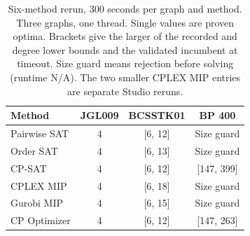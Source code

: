 \begin{table}[htbp]
\centering\small
\caption{Six-method rerun, 300 seconds per graph and method. Three graphs, one thread. Single values are proven optima. Brackets give the larger of the recorded and degree lower bounds and the validated incumbent at timeout. Size guard means rejection before solving (runtime N/A). The two smaller CPLEX MIP entries are separate Studio reruns.}
\label{tab:six-method-rerun}
\begin{tabular}{lccc}
\hline
Method & JGL009 & BCSSTK01 & BP 400 \\
\hline
Pairwise SAT & 4 & [6, 12] & Size guard \\
Order SAT & 4 & [6, 13] & Size guard \\
CP-SAT & 4 & [6, 12] & [147, 399] \\
CPLEX MIP & 4 & [6, 18] & Size guard \\
Gurobi MIP & 4 & [6, 15] & Size guard \\
CP Optimizer & 4 & [6, 12] & [147, 263] \\
\hline
\end{tabular}
\end{table}
